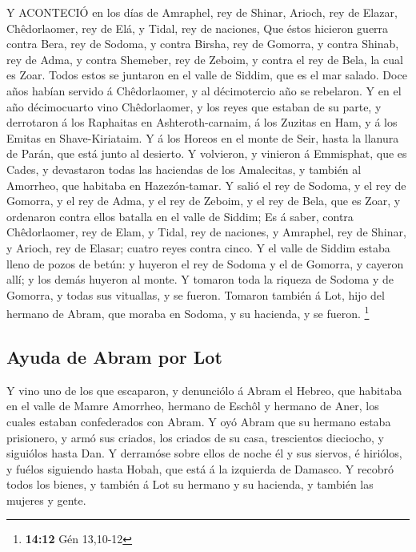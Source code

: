  Y ACONTECIÓ en los días de Amraphel, rey de Shinar, Arioch,
rey de Elazar, Chêdorlaomer, rey de Elá, y Tidal, rey de naciones,
 Que éstos hicieron guerra contra Bera, rey de Sodoma, y
contra Birsha, rey de Gomorra, y contra Shinab, rey de Adma, y contra
Shemeber, rey de Zeboim, y contra el rey de Bela, la cual es Zoar.
 Todos estos se juntaron en el valle de Siddim, que es el
mar salado.  Doce años habían servido á Chêdorlaomer, y al
décimotercio año se rebelaron.  Y en el año décimocuarto
vino Chêdorlaomer, y los reyes que estaban de su parte, y derrotaron á
los Raphaitas en Ashteroth-carnaim, á los Zuzitas en Ham, y á los Emitas
en Shave-Kiriataim.  Y á los Horeos en el monte de Seir,
hasta la llanura de Parán, que está junto al desierto.  Y
volvieron, y vinieron á Emmisphat, que es Cades, y devastaron todas las
haciendas de los Amalecitas, y también al Amorrheo, que habitaba en
Hazezón-tamar.  Y salió el rey de Sodoma, y el rey de
Gomorra, y el rey de Adma, y el rey de Zeboim, y el rey de Bela, que es
Zoar, y ordenaron contra ellos batalla en el valle de Siddim;
 Es á saber, contra Chêdorlaomer, rey de Elam, y Tidal, rey
de naciones, y Amraphel, rey de Shinar, y Arioch, rey de Elasar; cuatro
reyes contra cinco.  Y el valle de Siddim estaba lleno de
pozos de betún: y huyeron el rey de Sodoma y el de Gomorra, y cayeron
allí; y los demás huyeron al monte.  Y tomaron toda la
riqueza de Sodoma y de Gomorra, y todas sus vituallas, y se fueron.
 Tomaron también á Lot, hijo del hermano de Abram, que
moraba en Sodoma, y su hacienda, y se fueron. \footnote{\textbf{14:12}
  Gén 13,10-12}

\hypertarget{ayuda-de-abram-por-lot}{%
\subsection{Ayuda de Abram por Lot}\label{ayuda-de-abram-por-lot}}

 Y vino uno de los que escaparon, y denunciólo á Abram el
Hebreo, que habitaba en el valle de Mamre Amorrheo, hermano de Eschôl y
hermano de Aner, los cuales estaban confederados con Abram.
 Y oyó Abram que su hermano estaba prisionero, y armó sus
criados, los criados de su casa, trescientos dieciocho, y siguiólos
hasta Dan.  Y derramóse sobre ellos de noche él y sus
siervos, é hiriólos, y fuélos siguiendo hasta Hobah, que está á la
izquierda de Damasco.  Y recobró todos los bienes, y
también á Lot su hermano y su hacienda, y también las mujeres y gente.


